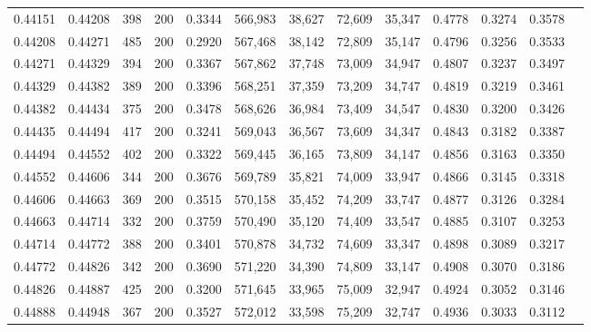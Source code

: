 \begin{tabular}{rrrrrrrrrrrrr}
0.44151 & 0.44208 &    398 & 200 &                                     0.3344 & 566,983 &  38,627 &  72,609 &  35,347 & 0.4778 & 0.3274 & 0.3578 \\
0.44208 & 0.44271 &    485 & 200 &                                     0.2920 & 567,468 &  38,142 &  72,809 &  35,147 & 0.4796 & 0.3256 & 0.3533 \\
0.44271 & 0.44329 &    394 & 200 &                                     0.3367 & 567,862 &  37,748 &  73,009 &  34,947 & 0.4807 & 0.3237 & 0.3497 \\
0.44329 & 0.44382 &    389 & 200 &                                     0.3396 & 568,251 &  37,359 &  73,209 &  34,747 & 0.4819 & 0.3219 & 0.3461 \\
0.44382 & 0.44434 &    375 & 200 &                                     0.3478 & 568,626 &  36,984 &  73,409 &  34,547 & 0.4830 & 0.3200 & 0.3426 \\
0.44435 & 0.44494 &    417 & 200 &                                     0.3241 & 569,043 &  36,567 &  73,609 &  34,347 & 0.4843 & 0.3182 & 0.3387 \\
0.44494 & 0.44552 &    402 & 200 &                                     0.3322 & 569,445 &  36,165 &  73,809 &  34,147 & 0.4856 & 0.3163 & 0.3350 \\
0.44552 & 0.44606 &    344 & 200 &                                     0.3676 & 569,789 &  35,821 &  74,009 &  33,947 & 0.4866 & 0.3145 & 0.3318 \\
0.44606 & 0.44663 &    369 & 200 &                                     0.3515 & 570,158 &  35,452 &  74,209 &  33,747 & 0.4877 & 0.3126 & 0.3284 \\
0.44663 & 0.44714 &    332 & 200 &                                     0.3759 & 570,490 &  35,120 &  74,409 &  33,547 & 0.4885 & 0.3107 & 0.3253 \\
0.44714 & 0.44772 &    388 & 200 &                                     0.3401 & 570,878 &  34,732 &  74,609 &  33,347 & 0.4898 & 0.3089 & 0.3217 \\
0.44772 & 0.44826 &    342 & 200 &                                     0.3690 & 571,220 &  34,390 &  74,809 &  33,147 & 0.4908 & 0.3070 & 0.3186 \\
0.44826 & 0.44887 &    425 & 200 &                                     0.3200 & 571,645 &  33,965 &  75,009 &  32,947 & 0.4924 & 0.3052 & 0.3146 \\
0.44888 & 0.44948 &    367 & 200 &                                     0.3527 & 572,012 &  33,598 &  75,209 &  32,747 & 0.4936 & 0.3033 & 0.3112 \\

\end{tabular}
